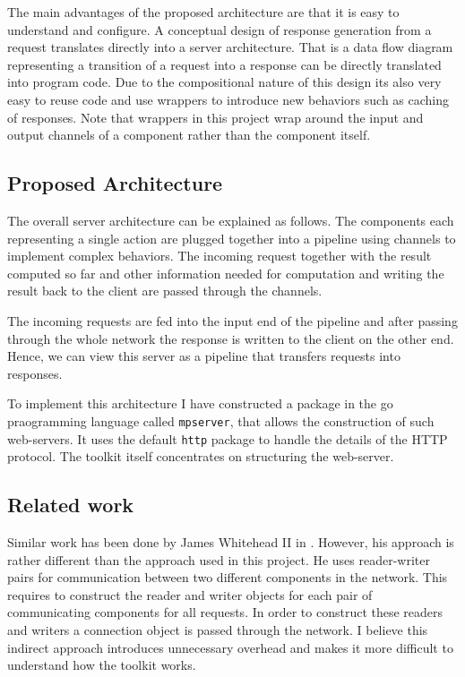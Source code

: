 \documentclass[12pt,a4paper]{article}
\begin{document}
The main advantages of the proposed architecture are that it is easy to understand
and configure. A conceptual design of response generation from a request translates 
directly into a server architecture. That is a data flow diagram representing a transition
of a request into a response can be directly translated into program code.
Due to the compositional nature of this design its also very easy to reuse code
and use wrappers to introduce new behaviors such as caching of responses.
Note that wrappers in this project wrap around the input and output channels
of a component rather than the component itself.

\subsection{Proposed Architecture}
The overall server architecture can be explained as follows.
The components each representing a single action are plugged together into 
a pipeline using channels to implement complex behaviors. The incoming
request together with the result computed so far and other 
information needed for computation and writing the result back to the client
are passed through the channels.

The incoming requests are fed into the input end of the pipeline and 
after passing through the whole network the response is written to the
client on the other end. Hence, we can view this server
as a pipeline that transfers requests into responses.

To implement this architecture I have constructed a package in the go praogramming 
language called \texttt{mpserver}, that allows the construction of such web-servers.
It uses the default \texttt{http} package to handle the details of
the HTTP protocol. The toolkit itself concentrates on structuring the 
web-server.

\subsection{Related work}
Similar work has been done by James Whitehead II in \cite{whitehead}.
However, his approach is rather different than the approach used 
in this project. He uses reader-writer pairs for communication between
two different components in the network. This requires to construct the
reader and writer objects for each pair of communicating components
for all requests.
In order to construct these readers and writers a connection object is 
passed through the network.
I believe this indirect approach introduces unnecessary overhead and 
makes it more difficult to understand how the toolkit works.
\end{document}
